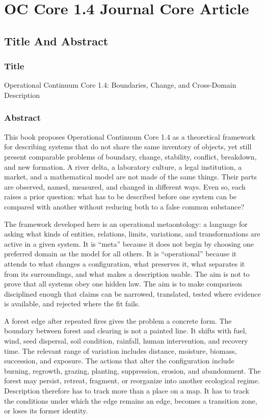 \documentclass[11pt,a4paper,openany]{book}
\begin{document}
\chapter{OC Core 1.4 Journal Core Article}
\section{Title And Abstract}
\subsection{Title}
Operational Continuum Core 1.4: Boundaries, Change, and Cross-Domain Description \cite{stauffer_percolation,grimmett_percolation}\par
\subsection{Abstract}
This book proposes Operational Continuum Core 1.4 as a theoretical framework for describing systems that do not share the same inventory of objects, yet still present comparable problems of boundary, change, stability, conflict, breakdown, and new formation. A river delta, a laboratory culture, a legal institution, a market, and a mathematical model are not made of the same things. Their parts are observed, named, measured, and changed in different ways. Even so, each raises a prior question: what has to be described before one system can be compared with another without reducing both to a false common substance? \cite{stauffer_percolation,grimmett_percolation}\par
The framework developed here is an operational metaontology: a language for asking what kinds of entities, relations, limits, variations, and transformations are active in a given system. It is ``meta'' because it does not begin by choosing one preferred domain as the model for all others. It is ``operational'' because it attends to what changes a configuration, what preserves it, what separates it from its surroundings, and what makes a description usable. The aim is not to prove that all systems obey one hidden law. The aim is to make comparison disciplined enough that claims can be narrowed, translated, tested where evidence is available, and rejected where the fit fails.\par
A forest edge after repeated fires gives the problem a concrete form. The boundary between forest and clearing is not a painted line. It shifts with fuel, wind, seed dispersal, soil condition, rainfall, human intervention, and recovery time. The relevant range of variation includes distance, moisture, biomass, succession, and exposure. The actions that alter the configuration include burning, regrowth, grazing, planting, suppression, erosion, and abandonment. The forest may persist, retreat, fragment, or reorganize into another ecological regime. Description therefore has to track more than a place on a map. It has to track the conditions under which the edge remains an edge, becomes a transition zone, or loses its former identity.\par
\end{document}
